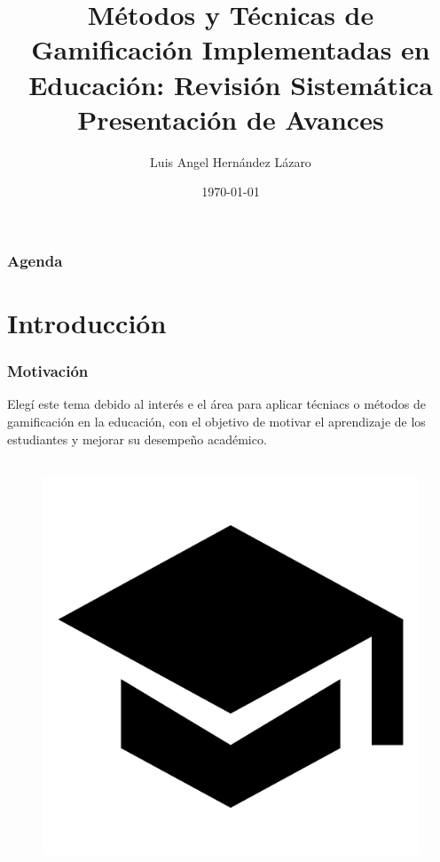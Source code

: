 \documentclass{beamer}
\title[Métodos y Técnicas de Gamificación en Educación]{Métodos y Técnicas de Gamificación Implementadas en Educación: Revisión Sistemática\\ Presentación de Avances} %
\author{Luis Angel Hernández Lázaro} %
\institute[C.I.M.A.T. A.C.] %
{
Centro de Investigación en Matemáticas A.C. Unidad Zacatecas \\ %
\medskip
\textit{luis.hernandez@cimat.com} %
}
\date{\today} %
\begin{document}
\begin{frame}
\titlepage
\end{frame}

\begin{frame}
\frametitle{Agenda}
\tableofcontents 
\end{frame}


\section{Introducción} %

\begin{frame}
	\frametitle{Motivación}
	Elegí este tema debido al interés e el área para aplicar técniacs o métodos de gamificación en la educación, con el objetivo de motivar el aprendizaje de los estudiantes y mejorar su desempeño académico.
	\\~\\
	
	\begin{figure}
		\begin{center}
			\includegraphics[scale=0.1]{images/2icons/student.png}
			\label{student}
		\end{center}
	\end{figure}
\end{frame}
\end{document}

